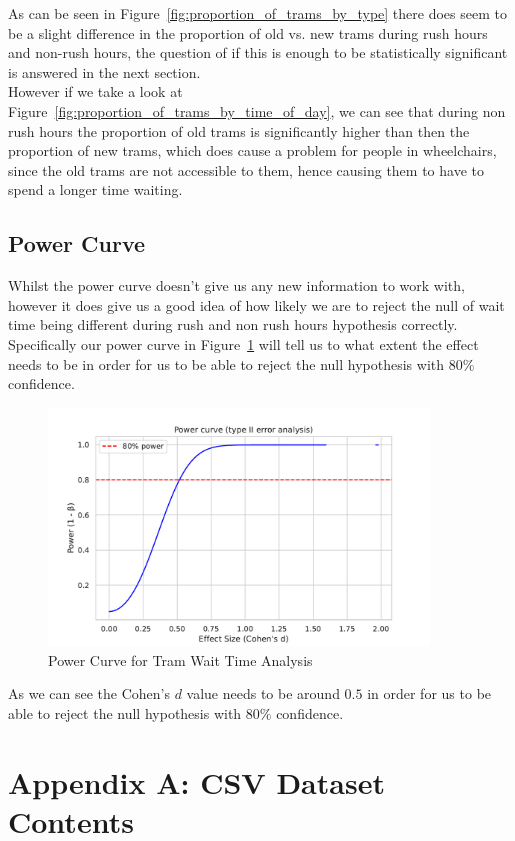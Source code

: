 \documentclass[a4paper, 10pt]{article}
\begin{document}
				\noindent As can be seen in Figure~\ref{fig:proportion_of_trams_by_type} there does seem to be a slight difference in 
				the proportion of old vs. new trams during rush hours and non-rush hours, the question of if this is enough 
				to be statistically significant is answered in the next section. \\

				\noindent However if we take a look at Figure~\ref{fig:proportion_of_trams_by_time_of_day}, we can see that during
				non rush hours the proportion of old trams is significantly higher than then the proportion of new trams, which does
				cause a problem for people in wheelchairs, since the old trams are not accessible to them, hence causing them to 
				have to spend a longer time waiting. \\

		\newpage
		\subsection{Power Curve}
				\noindent Whilst the power curve doesn't give us any new information to work with, 
				however it does give us a good idea of how likely we are to reject the null of wait time being different during
				rush and non rush hours hypothesis correctly. \\

				\noindent Specifically our power curve in Figure~\ref{fig:power_curve} 
				will tell us to what extent the effect needs to be in order for us to be able to reject the null hypothesis with
				$80\%$ confidence. \\

				\begin{figure}[h!]
					\centering
					\includegraphics[width=0.9\textwidth]{Plot_PowerCurve.pdf}
					\caption{Power Curve for Tram Wait Time Analysis}
					\label{fig:power_curve}	
				\end{figure}

				\noindent As we can see the Cohen's $d$ value needs to be around $0.5$ in order for us to be able to reject the null 
				hypothesis with $80\%$ confidence. \\

	\appendix
	\appendixpage 
	\addappheadtotoc
	\section*{Appendix A: CSV Dataset Contents}
	\label{sec:rawdata}
	
	
\end{document}
